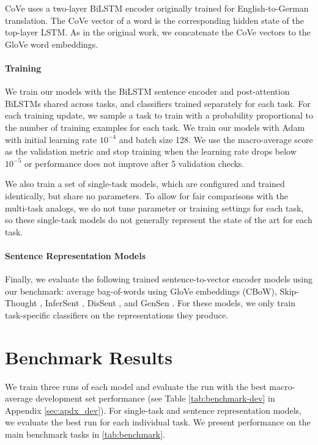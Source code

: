 CoVe \citep{mccann2017learned} uses a two-layer BiLSTM encoder originally trained for English-to-German translation. The CoVe vector of a word is the corresponding hidden state of the top-layer LSTM. As in the original work, we concatenate the CoVe vectors to the GloVe word embeddings. 

\paragraph{Training}

We train our models with the BiLSTM sentence encoder and post-attention BiLSTMs shared across tasks, and classifiers trained separately for each task. For each training update, we sample a task to train with a probability proportional to the number of training examples for each task. We train our models with Adam \citep{kingma2014adam} with initial learning rate $10^{-4}$ and batch size 128. We use the macro-average score as the validation metric and stop training when the learning rate drops below $10^{-5}$ or performance does not improve after 5 validation checks.

We also train a set of single-task models, which are configured and trained identically, but share no parameters. To allow for fair comparisons with the multi-task analogs, we do not tune parameter or training settings for each task, so these single-task models do not generally represent the state of the art for each task.

\paragraph{Sentence Representation Models}

Finally, we evaluate the following trained sentence-to-vector encoder models using our benchmark: average bag-of-words using GloVe embeddings (CBoW), Skip-Thought \citep{kiros2015skip}, InferSent \citep{DBLP:conf/emnlp/ConneauKSBB17}, DisSent \citep{nie2017dissent}, and GenSen \citep{subramanian2018large}. For these models, we only train task-specific classifiers on the representations they produce. 

\section{Benchmark Results}\label{sec:experiments}

We train three runs of each model and evaluate the run with the best macro-average development set performance (see Table \ref{tab:benchmark-dev} in Appendix \ref{sec:apdx_dev}). For single-task and sentence representation models, we evaluate the best run for each individual task. We present performance on the main benchmark tasks in \autoref{tab:benchmark}. 

